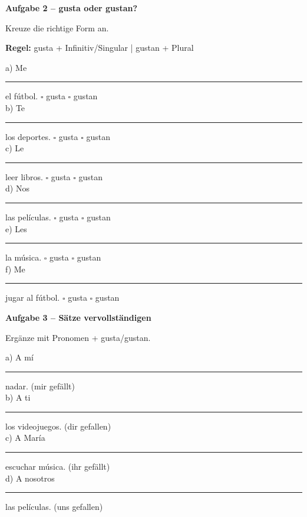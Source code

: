 \documentclass[11pt, a4paper]{article}
\newcommand{\fachfarbe}{spanisch}
\newcommand{\punktebox}[1]{\hfill\fbox{\small \_/#1}}
\newcommand{\luecke}[1]{\rule{#1}{0.4pt}}
\newenvironment{aufgabe}[1]{%
    \needspace{5\baselineskip}%
    \nopagebreak[4]%
    \vspace{10pt}
    \noindent\textbf{\textcolor{\fachfarbe}{Aufgabe #1}}
    \nopagebreak[4]%
    \vspace{5pt}
    \nopagebreak[4]%
    \begin{list}{}{\leftmargin=0pt}
    \item[]
}{%
    \end{list}
}
\begin{document}

\begin{aufgabe}{2 -- gusta oder gustan?}
Kreuze die richtige Form an. \punktebox{6}
\end{aufgabe}

\begin{hinweisbox}
\textbf{Regel:} gusta + Infinitiv/Singular | gustan + Plural
\end{hinweisbox}

\vspace{0.5em}

\noindent
a) Me \luecke{2cm} el fútbol. \hfill $\square$ gusta \quad $\square$ gustan\\[0.8em]
b) Te \luecke{2cm} los deportes. \hfill $\square$ gusta \quad $\square$ gustan\\[0.8em]
c) Le \luecke{2cm} leer libros. \hfill $\square$ gusta \quad $\square$ gustan\\[0.8em]
d) Nos \luecke{2cm} las películas. \hfill $\square$ gusta \quad $\square$ gustan\\[0.8em]
e) Les \luecke{2cm} la música. \hfill $\square$ gusta \quad $\square$ gustan\\[0.8em]
f) Me \luecke{2cm} jugar al fútbol. \hfill $\square$ gusta \quad $\square$ gustan

\vspace{15pt}


\begin{aufgabe}{3 -- Sätze vervollständigen}
Ergänze mit Pronomen + gusta/gustan. \punktebox{8}
\end{aufgabe}

\noindent
a) A mí \luecke{4cm} nadar. (mir gefällt)\\[1em]
b) A ti \luecke{4cm} los videojuegos. (dir gefallen)\\[1em]
c) A María \luecke{4cm} escuchar música. (ihr gefällt)\\[1em]
d) A nosotros \luecke{4cm} las películas. (uns gefallen)

\vspace{15pt}

\end{document}
